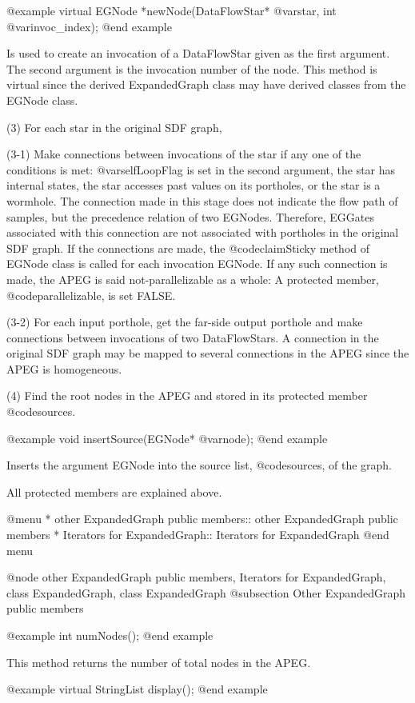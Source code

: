 @example
virtual EGNode *newNode(DataFlowStar* @var{star}, int @var{invoc_index});
@end example

Is used to create an invocation of a DataFlowStar given as the first
argument. The second argument is the invocation number of the node.
This method is virtual since the derived ExpandedGraph class may have
derived classes from the EGNode class.

(3) For each star in the original SDF graph, 

(3-1) Make connections between invocations of the star if any one of the
conditions is met: @var{selfLoopFlag} is set in the second argument,
the star has internal states, the star accesses past values on its
portholes, or the star is a wormhole. The connection made in this
stage does not indicate the flow path of samples, but the
precedence relation of two EGNodes. Therefore, EGGates associated
with this connection are not associated with portholes in the
original SDF graph. If the connections are made, 
the @code{claimSticky} method of EGNode class is called for each
invocation EGNode. If any such connection is made, the APEG
is said not-parallelizable as a whole: A protected member,
@code{parallelizable}, is set FALSE.

(3-2) For each input porthole, get the far-side output porthole and make
connections between invocations of two DataFlowStars. A connection
in the original SDF graph may be mapped to several connections
in the APEG since the APEG is homogeneous. 

(4) Find the root nodes in the APEG and stored in its protected member
@code{sources}.

@example
void insertSource(EGNode* @var{node});
@end example

Inserts the argument EGNode into the source list, @code{sources}, of 
the graph.
 
All protected members are explained above.

@menu
* other ExpandedGraph public members::	other ExpandedGraph public members
* Iterators for ExpandedGraph::		Iterators for ExpandedGraph
@end menu

@node other ExpandedGraph public members, Iterators for ExpandedGraph, class ExpandedGraph, class ExpandedGraph
@subsection Other ExpandedGraph public members

@example
int numNodes();
@end example

This method returns the number of total nodes in the APEG.

@example
virtual StringList display();
@end example

